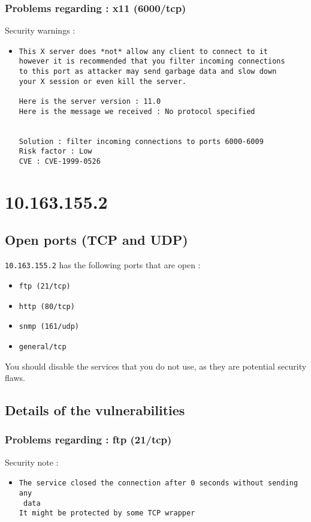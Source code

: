 \documentclass{article}
\begin{document}
\subsubsection{Problems regarding : x11 (6000/tcp)}
Security warnings :\\
\begin{itemize}
\item \begin{verbatim}
This X server does *not* allow any client to connect to it
however it is recommended that you filter incoming connections
to this port as attacker may send garbage data and slow down
your X session or even kill the server.

Here is the server version : 11.0
Here is the message we received : No protocol specified


Solution : filter incoming connections to ports 6000-6009
Risk factor : Low
CVE : CVE-1999-0526
\end{verbatim}\end{itemize}
\newpage
\section{10.163.155.2}
\subsection{Open ports (TCP and UDP)}
\verb+10.163.155.2+ has the following ports that are open : 
\begin{itemize}
\item\verb+ftp (21/tcp)+
\item\verb+http (80/tcp)+
\item\verb+snmp (161/udp)+
\item\verb+general/tcp+
\end{itemize}
You should disable the services that you do not use, as they are potential security flaws.
\subsection{Details of the vulnerabilities}
\subsubsection{Problems regarding : ftp (21/tcp)}
Security note :\\
\begin{itemize}
\item \begin{verbatim}
The service closed the connection after 0 seconds without sending any
 data
It might be protected by some TCP wrapper

\end{verbatim}\end{itemize}
\end{document}
